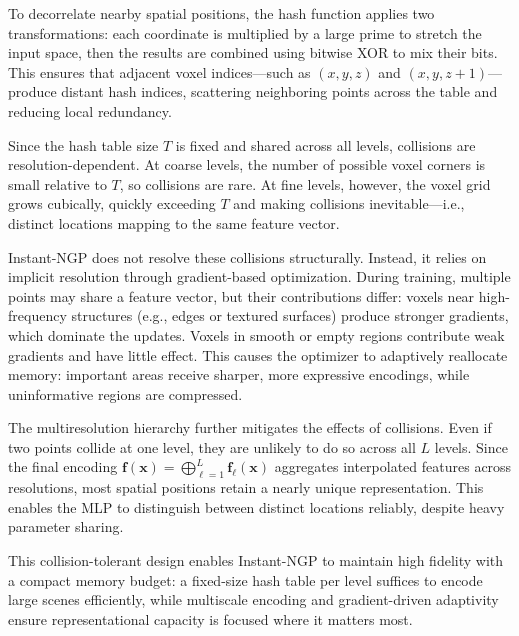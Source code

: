 \begin{enrichment}
\begin{enrichment}
    \medskip
    To decorrelate nearby spatial positions, the hash function applies two transformations: each coordinate is multiplied by a large prime to stretch the input space, then the results are combined using bitwise XOR to mix their bits. This ensures that adjacent voxel indices—such as \( (x, y, z) \) and \( (x, y, z+1) \)—produce distant hash indices, scattering neighboring points across the table and reducing local redundancy.
    
    \medskip
    Since the hash table size \( T \) is fixed and shared across all levels, collisions are resolution-dependent. At coarse levels, the number of possible voxel corners is small relative to \( T \), so collisions are rare. At fine levels, however, the voxel grid grows cubically, quickly exceeding \( T \) and making collisions inevitable—i.e., distinct locations mapping to the same feature vector.
    
    \medskip
    Instant-NGP does not resolve these collisions structurally. Instead, it relies on implicit resolution through gradient-based optimization. During training, multiple points may share a feature vector, but their contributions differ: voxels near high-frequency structures (e.g., edges or textured surfaces) produce stronger gradients, which dominate the updates. Voxels in smooth or empty regions contribute weak gradients and have little effect. This causes the optimizer to adaptively reallocate memory: important areas receive sharper, more expressive encodings, while uninformative regions are compressed.
    
    \medskip
    The multiresolution hierarchy further mitigates the effects of collisions. Even if two points collide at one level, they are unlikely to do so across all \( L \) levels. Since the final encoding \( \mathbf{f}(\mathbf{x}) = \bigoplus_{\ell=1}^L \mathbf{f}_\ell(\mathbf{x}) \) aggregates interpolated features across resolutions, most spatial positions retain a nearly unique representation. This enables the MLP to distinguish between distinct locations reliably, despite heavy parameter sharing.
    
    \medskip
    This collision-tolerant design enables Instant-NGP to maintain high fidelity with a compact memory budget: a fixed-size hash table per level suffices to encode large scenes efficiently, while multiscale encoding and gradient-driven adaptivity ensure representational capacity is focused where it matters most.
    

\end{enrichment}
\end{enrichment}
